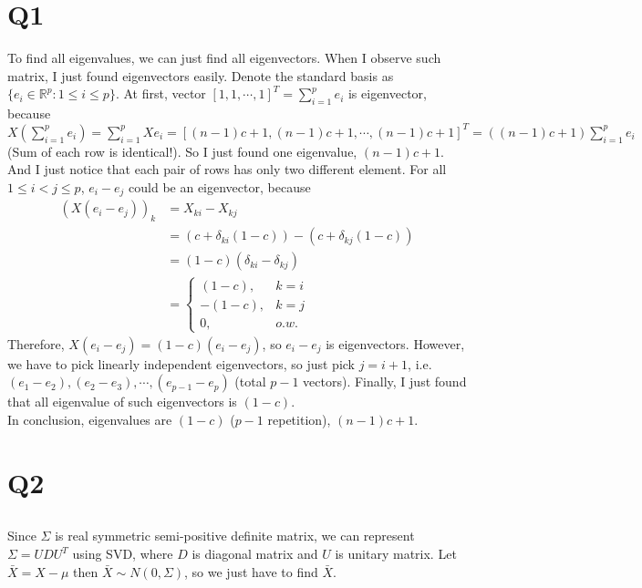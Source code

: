 \documentclass{article}
\begin{document}
\pagestyle{fancy}

\section{Q1}

To find all eigenvalues, we can just find all eigenvectors.
When I observe such matrix, I just found eigenvectors easily.
Denote the standard basis as $\{e_i \in \mathbb{R}^p: 1 \leq i \leq p\}$.
At first, vector $[1, 1, \cdots, 1]^T=\sum\limits_{i=1}^{p} e_i$ is eigenvector,
    because $X(\sum\limits_{i=1}^{p} e_i)
    = \sum\limits_{i=1}^{p} Xe_i
    = [(n-1)c+1, (n-1)c+1, \cdots, (n-1)c+1]^T
    = ((n-1)c+1)\sum\limits_{i=1}^{p} e_i$ (Sum of each row is identical!).
So I just found one eigenvalue, $(n-1)c+1$. \\

And I just notice that each pair of rows has only two different element.
For all $1 \leq i < j \leq p$, $e_i - e_j$ could be an eigenvector, because
\begin{align*}
    (X(e_i-e_j))_k &= X_{ki} - X_{kj} \\
    &= (c + \delta_{ki}(1-c)) - (c + \delta_{kj}(1-c)) \\
    &= (1-c)(\delta_{ki} - \delta_{kj}) \\
    &=
    \begin{cases}
        (1-c), & k=i \\
        -(1-c), & k=j \\
        0, & o.w.
    \end{cases}
\end{align*}
Therefore, $X(e_i-e_j) = (1-c)(e_i-e_j)$, so $e_i-e_j$ is eigenvectors.
However, we have to pick linearly independent eigenvectors, so just pick $j=i+1$, i.e.
    $(e_1-e_2), (e_2-e_3), \cdots, (e_{p-1}-e_p)$ (total $p-1$ vectors).
Finally, I just found that all eigenvalue of such eigenvectors is $(1-c)$. \\

In conclusion, eigenvalues are $(1-c)$ ($p-1$ repetition), $(n-1)c+1$.

\section{Q2}

\subsection{}
Since $\Sigma$ is real symmetric semi-positive definite matrix,
we can represent $\Sigma = UDU^T$ using SVD,
where $D$ is diagonal matrix and $U$ is unitary matrix.
Let $\bar{X} = X - \mu$ then $\bar{X} \sim N(0, \Sigma)$,
so we just have to find $\bar{X}$. \\
\end{document}
